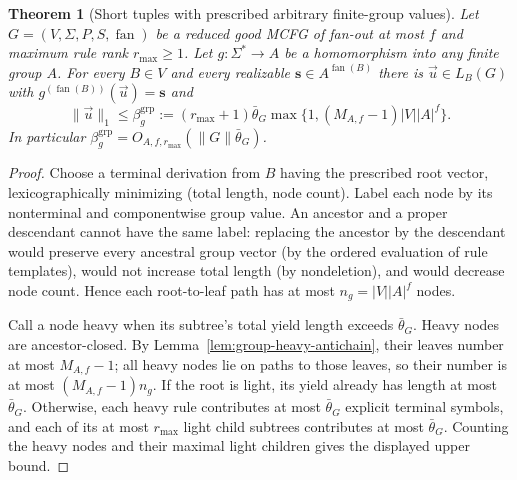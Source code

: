 \documentclass[11pt]{article}
\numberwithin{equation}{section}
\theoremstyle{plain}
\newtheorem{theorem}{Theorem}[section]
\theoremstyle{definition}
\theoremstyle{remark}
\newcommand{\tuple}[1]{\vec{#1}}
\newcommand{\fan}{\operatorname{fan}}
\theoremstyle{plain}
\begin{document}
\begin{theorem}[Short tuples with prescribed arbitrary finite-group values]
\label{thm:group-typed-shortest}
Let $G=(V,\Sigma,P,S,\fan)$ be a reduced good MCFG
of fan-out at most $f$ and maximum rule rank
$r_{\max}\ge1$.  Let $g:\Sigma^*\to A$ be a
homomorphism into \emph{any} finite group $A$.
For every $B\in V$ and every realizable
$\mathbf s\in A^{\fan(B)}$ there is
$\tuple u\in L_B(G)$ with
$g^{(\fan(B))}(\tuple u)=\mathbf s$ and
\[
 \|\tuple u\|_1\le
 \beta_g^{\mathrm{grp}}:=
 (r_{\max}+1)\bar\theta_G
 \max\{1,(M_{A,f}-1)|V||A|^f\}.
\]
In particular $\beta_g^{\mathrm{grp}}
=O_{A,f,r_{\max}}(\|G\|\bar\theta_G)$.
\end{theorem}
\begin{proof}
Choose a terminal derivation from $B$ having the
prescribed root vector, lexicographically minimizing
(total length, node count).  Label each node by
its nonterminal and componentwise group value.
An ancestor and a proper descendant cannot have
the same label: replacing the ancestor by the
descendant would preserve every ancestral group
vector (by the ordered evaluation of rule templates),
would not increase total length (by nondeletion),
and would decrease node count.  Hence each
root-to-leaf path has at most
$n_g=|V||A|^f$ nodes.

Call a node heavy when its subtree's total yield
length exceeds $\bar\theta_G$.  Heavy nodes are
ancestor-closed.  By
Lemma~\ref{lem:group-heavy-antichain},
their leaves number at most $M_{A,f}-1$;
all heavy nodes lie on paths to those leaves,
so their number is at most
$(M_{A,f}-1)n_g$.
If the root is light, its yield already has
length at most $\bar\theta_G$.
Otherwise, each heavy rule contributes at most
$\bar\theta_G$ explicit terminal symbols, and
each of its at most $r_{\max}$ light child
subtrees contributes at most $\bar\theta_G$.
Counting the heavy nodes and their maximal light
children gives the displayed upper bound.
\end{proof}
\end{document}
